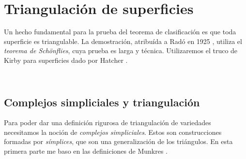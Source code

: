 \documentclass[10pt]{report}
\theoremstyle{definition}
\begin{document}


\chapter{Triangulación de superficies}

Un hecho fundamental para la prueba del teorema de clasificación es que toda superficie es triangulable. La demostración, atribuída a Radó en 1925 \cite{rado}, utiliza el \emph{teorema de Schönflies}, cuya prueba es larga y técnica. Utilizaremos el truco de Kirby para superficies dado por Hatcher \cite{hatcher_torus}.

\

\section{Complejos simpliciales y triangulación}

Para poder dar una definición rigurosa de triangulación de variedades necesitamos la noción de \textit{complejos simpliciales}. Estos son construcciones formadas por \textit{símplices}, que son una generalización de los triángulos. En esta primera parte me baso en las definiciones de Munkres \cite{munkres}.
\end{document}
